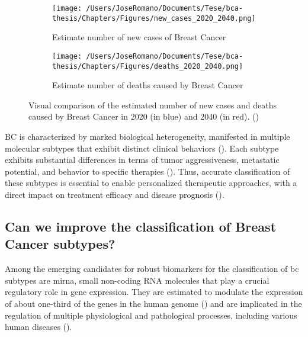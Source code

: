 \begin{figure}[h!]
  \centering
  \begin{subfigure}[b]{0.45\textwidth}
    \centering
    \texttt{[image: /Users/JoseRomano/Documents/Tese/bca-thesis/Chapters/Figures/new\_cases\_2020\_2040.png]}
    \caption{Estimate number of new cases of Breast Cancer}
    \label{fig:new_cases_2020_2040}
  \end{subfigure}
  \vspace{0.5cm}
  \begin{subfigure}[b]{0.45\textwidth}
    \centering
    \texttt{[image: /Users/JoseRomano/Documents/Tese/bca-thesis/Chapters/Figures/deaths\_2020\_2040.png]}
    \caption{Estimate number of deaths caused by Breast Cancer}
    \label{fig:deaths_2020_2040}
  \end{subfigure}
  \caption{Visual comparison of the estimated number of new cases and deaths caused by Breast Cancer
    in 2020 (in blue) and 2040 (in red). (\textcites{GLOBOCAN2022})}
  \label{fig:estimates_2020_2040}
\end{figure}

BC is characterized by marked biological heterogeneity, manifested in multiple
molecular subtypes that exhibit distinct clinical behaviors
(\textcite{bc_molecular_Perou2000}). Each subtype exhibits substantial
differences in terms of tumor aggressiveness, metastatic potential, and
behavior to specific therapies (\textcite{bc_subtypes_Prat2015Clinical}). Thus,
accurate classification of these subtypes is essential to enable personalized
therapeutic approaches, with a direct impact on treatment efficacy and disease
prognosis (\textcite{need_for_subtype_treatments_Testa2020Breast}).

\subsection{Can we improve the classification of Breast Cancer subtypes?}
Among the emerging candidates for robust biomarkers for the classification of
\gls{bc} subtypes are \gls{mirna}, small non-coding RNA molecules that play a
crucial regulatory role in gene expression. They are estimated to modulate the
expression of about one-third of the genes in the human genome
(\textcite{mirna_importance_Hammond2015An}) and are implicated in the
regulation of multiple physiological and pathological processes, including
various human diseases (\textcite{mirna_as_biomarkers_Ho2022}).

